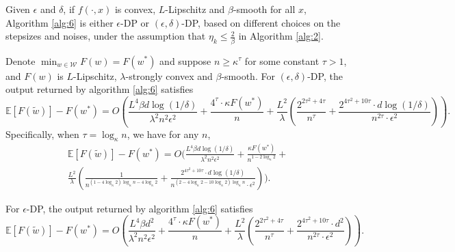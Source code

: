 \documentclass[12pt]{alt2022} %
\renewcommand{\tilde}{\widetilde}
\begin{document}
	\begin{theorem}\label{thm:6}
 Given $\epsilon$ and $\delta$, if $f(\cdot, x)$ is convex, $L$-Lipschitz and $\beta$-smooth for all $x$, Algorithm \ref{alg:6} is either $\epsilon$-DP or $(\epsilon,\delta)$-DP, based on different choices on the stepsizes and noises, under the assumption that $\eta_k\leq \frac{2}{\beta}$ in Algorithm \ref{alg:2}. 
\end{theorem}
\begin{theorem}\label{thm:7}
Denote $\min_{w\in\mathcal{W}}F(w)=F(w^*)$ and suppose $n\geq \kappa ^{\tau}$ for some constant  $\tau>1$, and $F(w)$ is $L$-Lipschitz, $\lambda$-strongly convex and $\beta$-smooth. For $(\epsilon,\delta)$-DP, 
	the output returned by algorithm \ref{alg:6} satisfies
	\begin{equation*}
	\mathbb{E}[F(\tilde{w})]-F(w^*)=O\left( \frac{L^4 \beta d\log(1/\delta)}{\lambda^2 n^2\epsilon^2}+\frac{4^{\tau}\cdot \kappa  F(w^{*})}{n} +\frac{ L^2}{\lambda}\left(\frac{2^{2\tau^2+4\tau}}{n^{\tau}}+\frac{2^{4\tau^2+10\tau  }\cdot d \log(1/\delta)}{n^{2\tau}\cdot \epsilon^2}\right)  \right).
	\end{equation*}
	Specifically, when $\tau=\log_{\kappa} n$, we have for any $n$,
	\begin{multline*}
	\mathbb{E}[F(\tilde{w})]-F(w^*)= O\big( \frac{L^4 \beta d\log(1/\delta)}{\lambda^2 n^2\epsilon^2}+\frac{\kappa  F(w^{*})}{n^{1-2\log_\kappa 2} } + \\\frac{ L^2}{\lambda}\left(\frac{1}{n^{(1-4\log_\kappa 2)\log_\kappa n- 4\log_\kappa 2}}+\frac{2^{4\tau^2+10\tau  }\cdot d \log(1/\delta)}{n^{(2-4\log_\kappa 2- 10\log_\kappa 2)\log_\kappa n }\cdot \epsilon^2}\right)  \big).
	\end{multline*}
	
	For $\epsilon$-DP, 
	the output returned by algorithm \ref{alg:6} satisfies
	\begin{equation*}
	\mathbb{E}[F(\tilde{w})]-F(w^*)=O\left( \frac{L^4 \beta d^2}{\lambda^2 n^2\epsilon^2}+\frac{4^{\tau}\cdot \kappa  F(w^{*})}{n} +\frac{ L^2}{\lambda}\left(\frac{2^{2\tau^2+4\tau}}{n^{\tau}}+\frac{2^{4\tau^2+10\tau  }\cdot d^2}{n^{2\tau}\cdot \epsilon^2}\right)  \right).
	\end{equation*}
\end{theorem}
\end{document}
